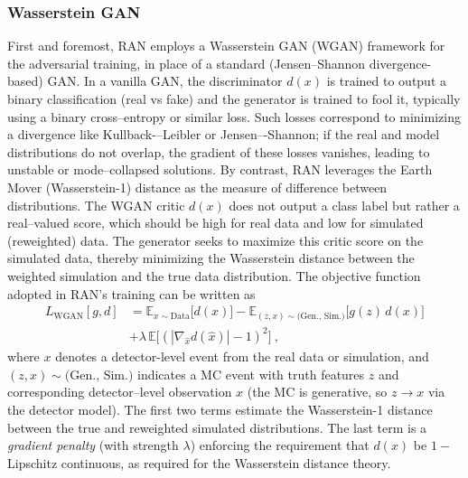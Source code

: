         \subsubsection{Wasserstein GAN}
            First and foremost, RAN employs a {Wasserstein GAN (WGAN)} framework for the adversarial training, in place of a standard (Jensen–Shannon divergence-based) GAN.
            In a vanilla GAN, the discriminator $d(x)$ is trained to output a binary classification (real vs fake) and the generator is trained to fool it, typically using a binary cross--entropy or similar loss.
            Such losses correspond to minimizing a divergence like Kullback-–Leibler or Jensen–-Shannon; if the real and model distributions do not overlap, the gradient of these losses vanishes, leading to unstable or mode--collapsed solutions.
            By contrast, RAN leverages the Earth Mover (Wasserstein-1) distance as the measure of difference between distributions.\kd{}
            The WGAN critic $d(x)$ does not output a class label but rather a real--valued score, which should be high for real data and low for simulated (reweighted) data.\kd{}
            The generator seeks to maximize this critic score on the simulated data, thereby minimizing the Wasserstein distance between the weighted simulation and the true data distribution.
            The objective function adopted in RAN’s training can be written as
            \begin{align}
                \label{eq:ran_wgan_loss}
                L_{\text{WGAN}}[g,d] &= \mathbb{E}_{x\sim \text{Data}}\big[d(x)\big] - \mathbb{E}_{(z,x)\sim \text{(Gen., Sim.)}}\big[g(z)\,d(x)\big]\\
                \nonumber&+ \lambda\,\mathbb{E}\!\Big[(|\nabla_{\hat{x}}d(\hat{x})| - 1)^2\Big]~,
            \end{align}
            where $x$ denotes a detector-level event from the real data or simulation, and $(z,x)\sim\text{(Gen., Sim.)}$ indicates a MC event with truth features $z$ and corresponding detector--level observation $x$ (the MC is generative, so $z\to x$ via the detector model).
            The first two terms estimate the Wasserstein-1 distance between the true and reweighted simulated distributions.
            The last term is a \emph{gradient penalty} (with strength $\lambda$) enforcing the requirement that $d(x)$ be \(1-\)Lipschitz continuous, as required for the Wasserstein distance theory.\kd{}
